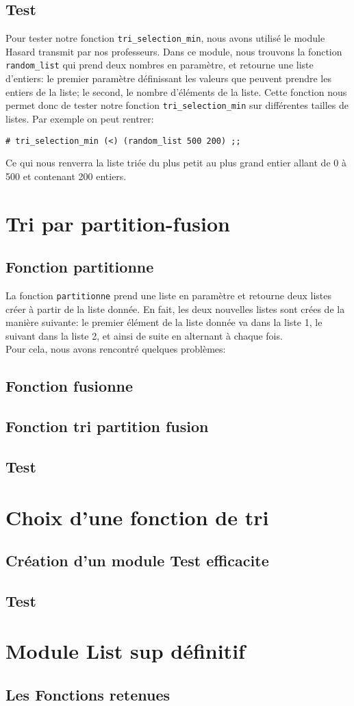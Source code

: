 \documentclass[a4paper, 11pt]{article}
\begin{document}
\subsection{Test}
Pour tester notre fonction \texttt{tri\_selection\_min}, nous avons utilisé le module Hasard transmit par nos professeurs. Dans ce module, nous trouvons la fonction \texttt{random\_list} qui prend deux nombres en paramètre, et retourne une liste d'entiers: le premier paramètre définissant les valeurs que peuvent prendre les entiers de la liste; le second, le nombre d'éléments de la liste.
Cette fonction nous permet donc de tester notre fonction \texttt{tri\_selection\_min} sur différentes tailles de listes. Par exemple on peut rentrer:\begin{verbatim}
# tri_selection_min (<) (random_list 500 200) ;;
\end{verbatim} 
Ce qui nous renverra la liste triée du plus petit au plus grand entier allant de 0 à 500 et contenant 200 entiers.
\section{Tri par partition-fusion}
\subsection{Fonction partitionne}
La fonction \texttt{partitionne} prend une liste en paramètre et retourne deux listes créer à partir de la liste donnée. En fait, les deux nouvelles listes sont crées de la manière suivante: le premier élément de la liste donnée va dans la liste 1, le suivant dans la liste 2, et ainsi de suite en alternant à chaque fois.\\ Pour cela, nous avons rencontré quelques problèmes: 
\subsection{Fonction fusionne}

\subsection{Fonction tri partition fusion}

\subsection{Test}


\section{Choix d'une fonction de tri}
\subsection{Création d'un module Test efficacite}

\subsection{Test}


\section{Module List sup définitif}
\subsection{Les Fonctions retenues}
\end{document}
